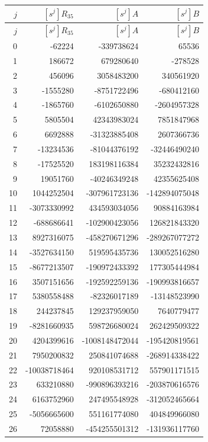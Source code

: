 \begin{longtable}{r|r|r|r}
$j$ & $[s^j]R_{35}$ & $[s^j]A$ & $[s^j]B$\\\hline
\endfirsthead
$j$ & $[s^j]R_{35}$ & $[s^j]A$ & $[s^j]B$\\\hline
\endhead
0 & {-}62224 & {-}339738624 & 65536\\
1 & 186672 & 679280640 & {-}278528\\
2 & 456096 & 3058483200 & 340561920\\
3 & {-}1555280 & {-}8751722496 & {-}680412160\\
4 & {-}1865760 & {-}6102650880 & {-}2604957328\\
5 & 5805504 & 42343983024 & 7851847968\\
6 & 6692888 & {-}31323885408 & 2607366736\\
7 & {-}13234536 & {-}81044376192 & {-}32446490240\\
8 & {-}17525520 & 183198116384 & 35232432816\\
9 & 19051760 & {-}40246349248 & 42355625408\\
10 & 1044252504 & {-}307961723136 & {-}142894075048\\
11 & {-}3073330992 & 434593034056 & 90884163984\\
12 & {-}688686641 & {-}102900423056 & 126821843320\\
13 & 8927316075 & {-}458270671296 & {-}289267077272\\
14 & {-}3527634150 & 519595435736 & 130052516280\\
15 & {-}8677213507 & {-}190972433392 & 177305444984\\
16 & 3507151656 & {-}192592259136 & {-}190993816657\\
17 & 5380558488 & {-}82326017189 & {-}13148523990\\
18 & 244237845 & 129237959050 & 7640779477\\
19 & {-}8281660935 & 598726680024 & 262429509322\\
20 & 4204399616 & {-}1008148472044 & {-}195420819561\\
21 & 7950200832 & 250841074688 & {-}268914338422\\
22 & {-}10038718464 & 920108531712 & 557901171515\\
23 & 633210880 & {-}990896393216 & {-}203870616576\\
24 & 6163752960 & 247495548928 & {-}312052465664\\
25 & {-}5056665600 & 551161774080 & 404849966080\\
26 & 72058880 & {-}454255501312 & {-}131936117760\\

\end{longtable}
